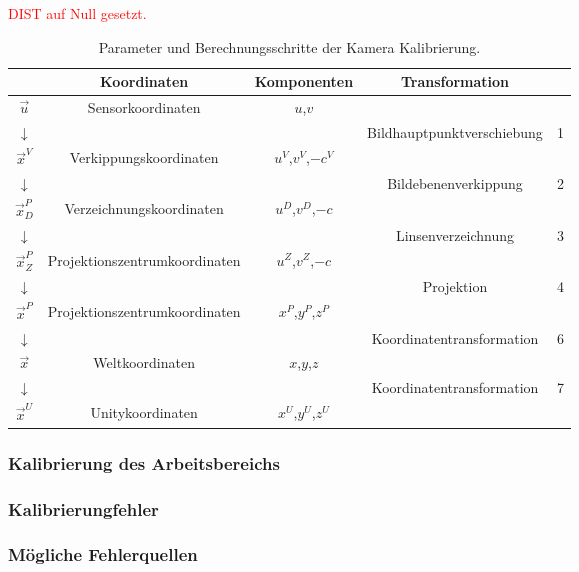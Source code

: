 \textcolor{red}{DIST auf Null gesetzt.} \cite{7532899}



	
\begin{table}
	\centering
	\renewcommand{\arraystretch}{1.4}
	\begin{tabular}{|c|c|c|c|c|}
		\hline
		\Absatzbox{}
		& \textbf{Koordinaten} & \textbf{Komponenten}&\textbf{Transformation} &\\
		\hline
		$\overrightarrow{u}$ & Sensorkoordinaten &$u$,$v$ & &\\
		\cline{2-4}
		$\downarrow$ & & & Bildhauptpunktverschiebung& 1\\
		\cline{2-4}		
		$\overrightarrow{x}^V$ &Verkippungskoordinaten &$u^V$,$v^V$,$-c^V$& &\\
		\cline{2-4}
		$\downarrow$ & & & Bildebenenverkippung& 2\\
		\cline{2-4}	
		$\overrightarrow{x}^P_D$ & Verzeichnungskoordinaten &$u^D$,$v^D$,$-c$& &\\
		\cline{2-4}
		$\downarrow$ & & & Linsenverzeichnung& 3\\
		\cline{2-4}
		$\overrightarrow{x}^P_Z$ & Projektionszentrumkoordinaten &$u^Z$,$v^Z$,$-c$& &\\
		\cline{2-4}
		$\downarrow$ & & & Projektion &4\\
		\cline{2-4}
		$\overrightarrow{x}^P$ & Projektionszentrumkoordinaten &$x^P$,$y^P$,$z^P$& &\\
		\cline{2-4}
		$\downarrow$ & & & Koordinatentransformation& 6\\
		\cline{2-4}
		$\overrightarrow{x}$ & Weltkoordinaten &$x$,$y$,$z$& & \\
		\cline{2-4}
		$\downarrow$ & & & Koordinatentransformation &7\\
		\cline{2-4}		
		$\overrightarrow{x}^U$ & Unitykoordinaten &$x^U$,$y^U$,$z^U$& &\\
		\hline
	\end{tabular}
	\caption{Parameter und Berechnungsschritte der Kamera Kalibrierung.\cite{Meisel:77890}}
	\label{tab:camCalibParam}
\end{table}

\subsubsection{Kalibrierung des Arbeitsbereichs}\label{sec:planeCalib}
\subsubsection{Kalibrierungfehler} \label{sec:calibError}
\subsubsection{Mögliche Fehlerquellen} \label{sec:calibErrorSources}


